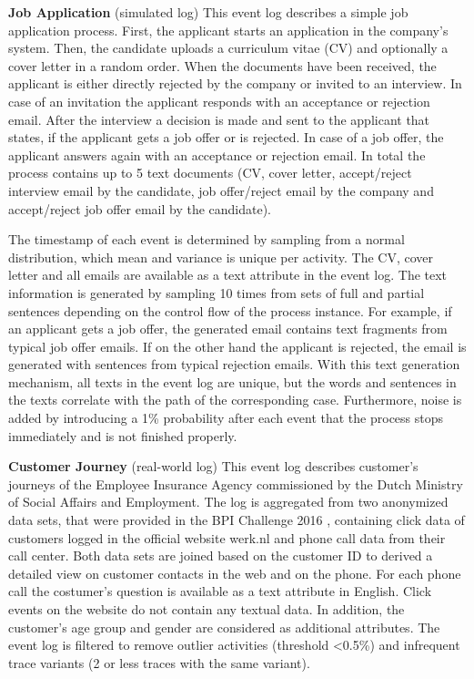 \textbf{Job Application} (simulated log) This event log describes a simple job application process. 
First, the applicant starts an application in the company's system.
Then, the candidate uploads a curriculum vitae (CV) and optionally a cover letter in a random order.
When the documents have been received, the applicant is either directly rejected by the company or invited to an interview.
In case of an invitation the applicant responds with an acceptance or rejection email.
After the interview a decision is made and sent to the applicant that states, if the applicant gets a job offer or is rejected.
In case of a job offer, the applicant answers again with an acceptance or rejection email.
In total the process contains up to 5 text documents (CV, cover letter, accept/reject interview email by the candidate, job offer/reject email by the company and accept/reject job offer email by the candidate).

The timestamp of each event is determined by sampling from a normal distribution, which mean and variance is unique per activity.
The CV, cover letter and all emails are available as a text attribute in the event log.
The text information is generated by sampling 10 times from sets of full and partial sentences depending on the control flow of the process instance.
For example, if an applicant gets a job offer, the generated email contains text fragments from typical job offer emails.
If on the other hand the applicant is rejected, the email is generated with sentences from typical rejection emails.
With this text generation mechanism, all texts in the event log are unique, but the words and sentences in the texts correlate with the path of the corresponding case.
Furthermore, noise is added by introducing a 1\% probability after each event that the process stops immediately and is not finished properly.

\textbf{Customer Journey} (real-world log) This event log describes customer's journeys of the Employee Insurance Agency commissioned by the Dutch Ministry of Social Affairs and Employment.
The log is aggregated from two anonymized data sets, that were provided in the BPI Challenge 2016 \cite{bpichallenge2016}, containing click data of customers logged in the official website werk.nl and phone call data from their call center.
Both data sets are joined based on the customer ID to derived a detailed view on customer contacts in the web and on the phone.
For each phone call the costumer's question is available as a text attribute in English.
Click events on the website do not contain any textual data.
In addition, the customer's age group and gender are considered as additional attributes.
The event log is filtered to remove outlier activities (threshold <0.5\%) and infrequent trace variants (2 or less traces with the same variant).

